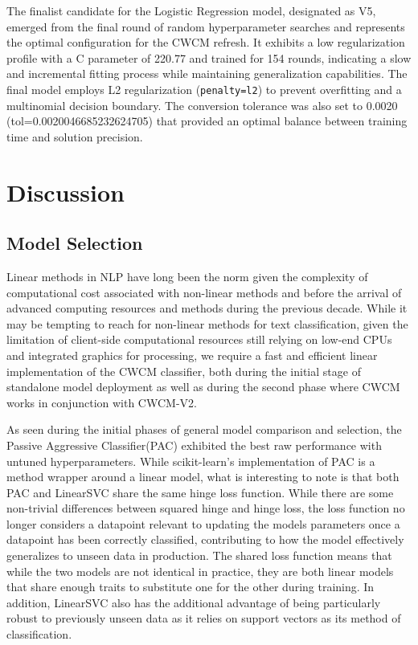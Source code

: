 \documentclass[
  titlepage]{article}
\begin{document}
The finalist candidate for the Logistic Regression model, designated as
V5, emerged from the final round of random hyperparameter searches and
represents the optimal configuration for the CWCM refresh. It exhibits a
low regularization profile with a C parameter of 220.77 and trained for
154 rounds, indicating a slow and incremental fitting process while
maintaining generalization capabilities. The final model employs L2
regularization (\texttt{penalty=\textquotesingle{}l2\textquotesingle{}})
to prevent overfitting and a multinomial decision boundary. The
conversion tolerance was also set to 0.0020 (tol=0.0020046685232624705)
that provided an optimal balance between training time and solution
precision.

\section{Discussion}\label{discussion}

\subsection{Model Selection}\label{model-selection-1}

Linear methods in NLP have long been the norm given the complexity of
computational cost associated with non-linear methods and before the
arrival of advanced computing resources and methods during the previous
decade. While it may be tempting to reach for non-linear methods for
text classification, given the limitation of client-side computational
resources still relying on low-end CPUs and integrated graphics for
processing, we require a fast and efficient linear implementation of the
CWCM classifier, both during the initial stage of standalone model
deployment as well as during the second phase where CWCM works in
conjunction with CWCM-V2.

As seen during the initial phases of general model comparison and
selection, the Passive Aggressive Classifier(PAC) exhibited the best raw
performance with untuned hyperparameters. While scikit-learn's
implementation of PAC is a method wrapper around a linear model, what is
interesting to note is that both PAC and LinearSVC share the same hinge
loss function. While there are some non-trivial differences between
squared hinge and hinge loss, the loss function no longer considers a
datapoint relevant to updating the models parameters once a datapoint
has been correctly classified, contributing to how the model effectively
generalizes to unseen data in production. The shared loss function means
that while the two models are not identical in practice, they are both
linear models that share enough traits to substitute one for the other
during training. In addition, LinearSVC also has the additional
advantage of being particularly robust to previously unseen data as it
relies on support vectors as its method of classification.
\end{document}
